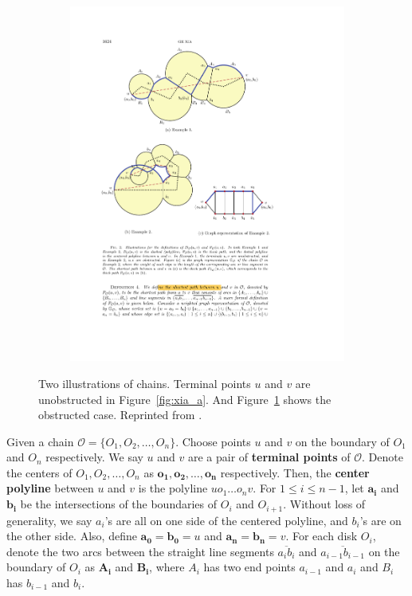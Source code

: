 \begin{figure}[ht]
\begin{subfigure}{.8\textwidth}
\centering
\includegraphics[width=.6\linewidth]{Figures/xia_b.pdf}
\caption{} \label{fig:xia_b}
\end{subfigure}
\caption[Two illustrations of chains]{Two illustrations of chains. Terminal points $u$ and $v$ are unobstructed in Figure~\ref{fig:xia_a}. And Figure~\ref{fig:xia_b} shows the obstructed case.  Reprinted from \cite{xia}.} \label{fig:xia}
\end{figure}



\begin{definition}
Given a  chain $\mathcal{O} = \{O_1, O_2, \dots, O_n\}$. Choose points $u$ and $v$ on the boundary of $O_1$ and $O_n$  respectively. We say $u$ and $v$ are a pair of \textbf{terminal points} of $\mathcal{O}$. Denote the centers of $O_1, O_2, \dots, O_n$ as {$\boldsymbol{o_1, o_2, \dots, o_n}$} respectively. Then,  the \textbf{center polyline} between $u$ and $v$ is the polyline $uo_1\dots o_nv$. For $1\le i\le n-1$, let $\boldsymbol{a_i}$ and $\boldsymbol{b_i}$ be the intersections of the boundaries of $O_i$ and $O_{i+1}$. Without loss of generality, we say $a_i$'s are all on one side of the centered polyline, and $b_i$'s are on the other side. Also, define $\boldsymbol{a_0}=\boldsymbol{b_0} = u$ and $\boldsymbol{a_n}=\boldsymbol{b_n} = v$. For each disk $O_i$, denote the two arcs between the straight line segments $\overline{a_ib_i}$ and $\overline{a_{i-1}b_{i-1}}$ on the boundary of $O_i$ as $\boldsymbol{A_i}$ and $\boldsymbol{B_i}$, where $A_i$ has two end points $a_{i-1}$ and $a_i$ and $B_i$ has $b_{i-1}$ and $b_i$.
\end{definition}


